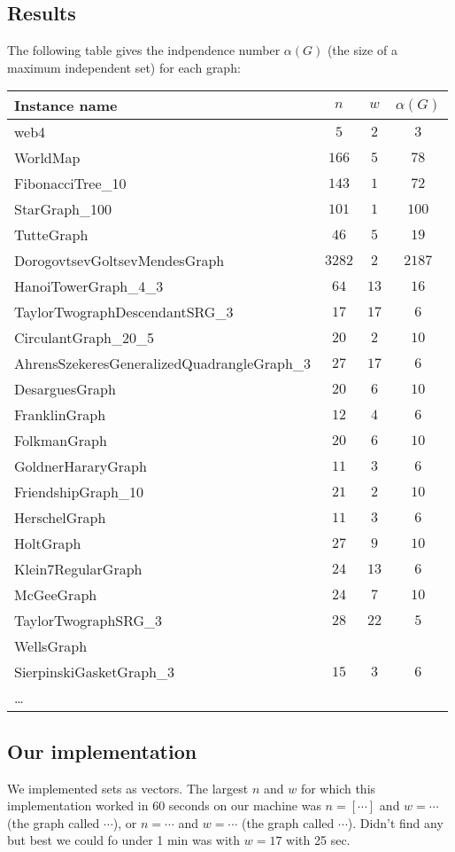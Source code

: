 \documentclass{tufte-handout}
\begin{document}
\subsection{Results}

The following table gives the indpendence number $\alpha(G)$ (the size of a maximum independent set) for each graph:


\medskip
\begin{tabular}{lccc}
  \toprule
  Instance name & $n$ & $w$ & $\alpha(G)$   \\
  \midrule
  web4 & $5$ & $2$ & $3$ \\ 
  WorldMap & $166$ & $5$ & $78$ \\
  FibonacciTree\_10 & $143$ & $1$ & $72$ \\
  StarGraph\_100 & $101$ & $1$ & $100$ \\
  TutteGraph & $46$ & $5$ & $19$ \\
DorogovtsevGoltsevMendesGraph & $3282$ & $2$ & $2187$ \\
HanoiTowerGraph\_4\_3 & $64$ & $13$ & $16$ \\
TaylorTwographDescendantSRG\_3 & $17$ & $17$ & $6$ \\
CirculantGraph\_20\_5 & $20$ & $2$ & $10$ \\
AhrensSzekeresGeneralizedQuadrangleGraph\_3 & $27$ & $17$ & $6$ \\
DesarguesGraph & $20$ & $6$ & $10$ \\
  FranklinGraph & $12$ & $4$ & $6$ \\
FolkmanGraph & $20$ & $6$ & $10$ \\
  GoldnerHararyGraph & $11$ & $3$ & $6$ \\
FriendshipGraph\_10 & $21$ & $2$ & $10$ \\
  HerschelGraph & $11$ & $3$ & $6$ \\
HoltGraph & $27$ & $9$ & $10$ \\
  Klein7RegularGraph & $24$ & $13$ & $6$ \\
McGeeGraph & $24$ & $7$ & $10$ \\
TaylorTwographSRG\_3 & $28$ & $22$ & $5$ \\
WellsGraph \\
  SierpinskiGasketGraph\_3 & $15$ & $3$ & $6$ \\

  \ldots\\
  \bottomrule
\end{tabular}


\subsection{Our implementation}

We implemented sets as vectors.
The largest $n$ and $w$ for which this implementation worked  in 60 seconds on our
machine was $n=[\cdots]$ and $w=\cdots$ (the graph called $\cdots$), or $n=\cdots$ and $w=\cdots$ (the graph called $\cdots$). Didn't find any but best we could fo under 1 min was with $w=17$ with 25 sec.
\end{document}
